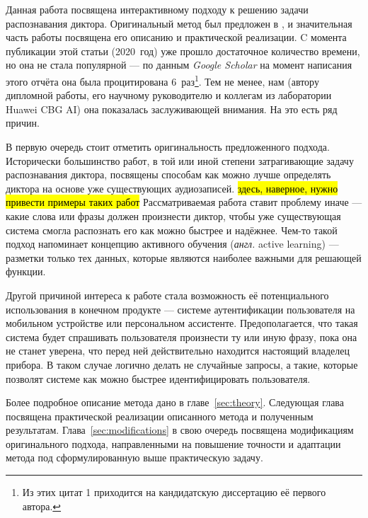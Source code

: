 Данная работа посвящена интерактивному подходу к решению задачи распознавания
диктора.  Оригинальный метод был предложен в \citeisr, и значительная часть
работы посвящена его описанию и практической реализации. C момента публикации
этой статьи (2020~год) уже прошло достаточное количество времени, но она не
стала популярной --- по данным \textit{Google Scholar} на момент написания
этого отчёта она была процитирована 6~раз\footnote{
    Из этих цитат 1 приходится на кандидатскую диссертацию её первого автора.
}.
Тем не менее, нам (автору дипломной работы, его научному руководителю и коллегам
из лаборатории Huawei CBG AI) она показалась заслуживающей внимания. На это есть
ряд причин.

В первую очередь стоит отметить оригинальность предложенного подхода.
Исторически большинство работ, в той или иной степени затрагивающие задачу
распознавания диктора, посвящены способам как можно лучше определять диктора
на основе уже существующих аудиозаписей. \hl{здесь, наверное, нужно привести
примеры таких работ} Рассматриваемая работа ставит проблему иначе --- какие
слова или фразы должен произнести диктор, чтобы уже существующая система
смогла распознать его как можно быстрее и надёжнее. Чем-то такой подход
напоминает концепцию активного обучения (\textit{англ.} active learning) ---
разметки только тех данных, которые являются наиболее важными для решающей
функции.

Другой причиной интереса к работе стала возможность её потенциального использования
в конечном продукте --- системе аутентификации пользователя на мобильном устройстве
или персональном ассистенте. Предополагается, что такая система будет спрашивать
пользователя произнести ту или иную фразу, пока она не станет уверена, что перед
ней действительно находится настоящий владелец прибора. В таком случае логично
делать не случайные запросы, а такие, которые позволят системе как можно быстрее
идентифицировать пользователя. 

Более подробное описание метода дано в главе~\ref{sec:theory}. Следующая глава
посвящена практической реализации описанного метода и полученным результатам.
Глава~\ref{sec:modifications} в свою очередь посвящена модификациям
оригинального подхода, направленными на повышение точности и адаптации метода
под сформулированную выше практическую задачу.